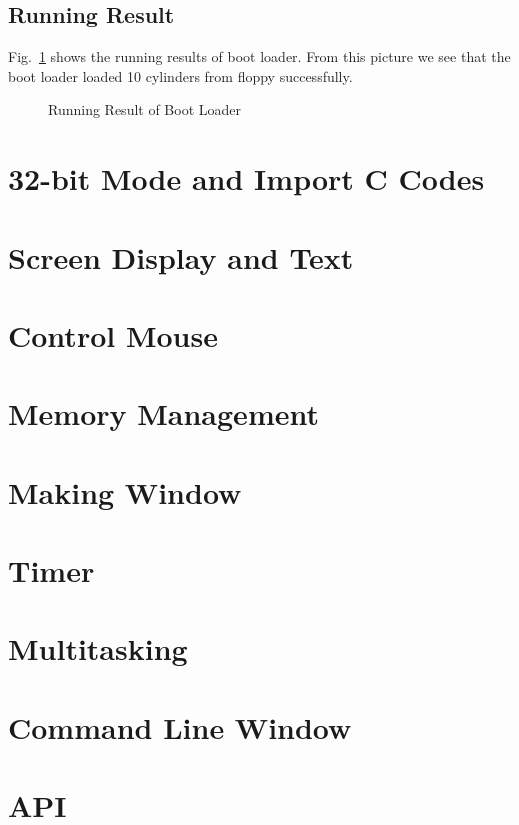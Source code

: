 \documentclass{swfcthesis}
\begin{document}
\subsection{Running Result}

Fig.~\ref{fig:iplRes} shows the running results of boot loader. From this picture we
see that the boot loader loaded 10 cylinders from floppy successfully. 

\begin{figure}[!ht]
  \centering
  \caption{Running Result of Boot Loader}\label{fig:iplRes}  
\end{figure}


\section{32-bit Mode and Import C Codes}


\section{Screen Display and Text}

\section{Control Mouse}


\section{Memory Management}

\section{Making Window }

\section{Timer}

\section{Multitasking}

\section{Command Line Window}

\section{API}
\end{document}
